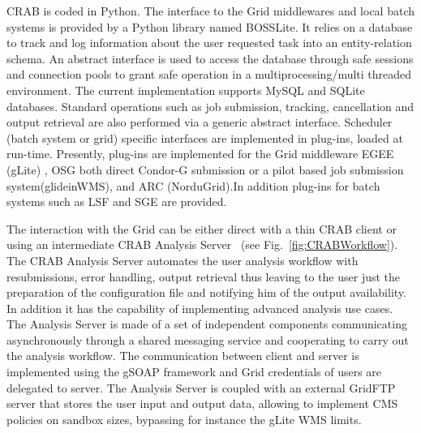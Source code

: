 CRAB is coded in Python. The interface to the Grid middlewares and local batch systems is provided by a Python library named BOSSLite\cite{RefBOSSLite}. It relies on a database to track and log information about the user requested task into an entity-relation schema.
An abstract interface is used to access the database through safe sessions and connection pools to grant safe operation in a multiprocessing/multi threaded environment. The current implementation supports MySQL and SQLite databases.
Standard operations such as job submission, tracking, cancellation and output retrieval are also performed via a generic abstract interface. Scheduler (batch system or grid) specific interfaces are implemented in plug-ins, loaded at run-time. Presently, plug-ins are implemented for the Grid middleware EGEE (gLite) \cite{RefgLiteWMS}, OSG \cite{RefOSG} both direct Condor-G submission or a pilot based job submission system(glideinWMS\cite{Refglidein}), and ARC (NorduGrid)\cite{RefARC}.In addition plug-ins for batch systems such as LSF and SGE are provided.

The interaction with the Grid can be either direct with a thin CRAB client or using an intermediate CRAB Analysis Server~\cite{RefCRAB} (see Fig.~\ref{fig:CRABWorkflow}). The CRAB Analysis Server automates the user analysis workflow with resubmissions, error handling, output retrieval thus leaving to the user just the preparation of the configuration file and notifying him of the output availability. In addition it has the capability of implementing advanced analysis use cases.
The Analysis Server is made of a set of independent components communicating asynchronously through a shared messaging service and cooperating to carry out the analysis workflow. The communication between client and server is implemented using the gSOAP framework and Grid credentials of users are delegated to server.
The Analysis Server is coupled with an external GridFTP server %
 that stores the user input and output data, allowing to implement CMS policies on sandbox sizes, bypassing for instance the gLite WMS limits.


